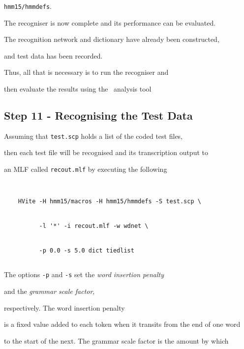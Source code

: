 \texttt{hmm15/hmmdefs}.










The recogniser is now complete and its performance can be evaluated.  


The recognition network and dictionary have already been constructed, 


and test data has been recorded.  


Thus, all that is necessary is to run the recogniser and 


then evaluate the results using the \HTK\ analysis tool 





\subsection{Step 11 - Recognising the Test Data}





Assuming that \texttt{test.scp} holds a list of the coded test files,


then each test file will be recognised and its transcription output to


an MLF called \texttt{recout.mlf} by executing the following


\begin{verbatim}


    HVite -H hmm15/macros -H hmm15/hmmdefs -S test.scp \


          -l '*' -i recout.mlf -w wdnet \


          -p 0.0 -s 5.0 dict tiedlist


\end{verbatim}


The options \texttt{-p} and \texttt{-s} set the \textit{word insertion penalty}




and the \textit{grammar scale factor}, 


respectively.  The word insertion penalty


is a fixed value added to each token when it transits from the end of one word


to the start of the next.  The grammar scale factor is the amount by which



